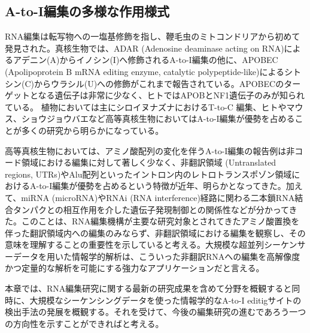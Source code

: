 \subsection{A-to-I編集の多様な作用様式}
RNA編集は転写物への一塩基修飾を指し、鞭毛虫のミトコンドリアから初めて発見された。真核生物では、ADAR (Adenosine deaminase acting on RNA)によるアデニン(A)からイノシン(I)へ修飾されるA-to-I編集の他に、APOBEC (Apolipoprotein B mRNA editing enzyme, catalytic polypeptide-like)によるシトシン(C)からウラシル(U)への修飾がこれまで報告されている。APOBECのターゲットとなる遺伝子は非常に少なく、ヒトではAPOBとNF1遺伝子のみが知られている。
植物においては主にシロイヌナズナにおけるT-to-C 編集、ヒトやマウス、ショウジョウバエなど高等真核生物においてはA-to-I編集が優勢を占めることが多くの研究から明らかになっている。
\par
高等真核生物においては、アミノ酸配列の変化を伴うA-to-I編集の報告例は非コード領域における編集に対して著しく少なく、非翻訳領域 (Untranslated regions, UTRs)やAlu配列といったイントロン内のレトロトランスポゾン領域におけるA-to-I編集が優勢を占めるという特徴が近年、明らかとなってきた。加えて、miRNA (microRNA)やRNAi (RNA interference)経路に関わる二本鎖RNA結合タンパクとの相互作用を介した遺伝子発現制御との関係性などが分かってきた。このことは、RNA編集機構が主要な研究対象とされてきたアミノ酸置換を伴った翻訳領域内への編集のみならず、非翻訳領域における編集を観察し、その意味を理解することの重要性を示していると考える。大規模な超並列シーケンサーデータを用いた情報学的解析は、こういった非翻訳RNAへの編集を高解像度かつ定量的な解析を可能にする強力なアプリケーションだと言える。
\par
本章では、RNA編集研究に関する最新の研究成果を含めて分野を概観すると同時に、大規模なシーケンシングデータを使った情報学的なA-to-I editigサイトの検出手法の発展を概観する。それを受けて、今後の編集研究の進むであろう一つの方向性を示すことができればと考える。

